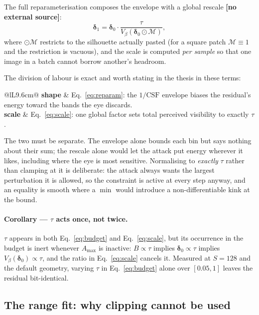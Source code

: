 \documentclass[11pt,a4paper]{article}
\newcommand{\novel}{\textbf{[no external source]}}
\begin{document}
The full reparameterisation composes the envelope with a global rescale
\novel{}:
\begin{equation}
  \boldsymbol{\delta}_1 = \boldsymbol{\delta}_0\cdot
     \frac{\tau}{V_\beta\!\left(\boldsymbol{\delta}_0\odot\mathcal{M}\right)} ,
  \label{eq:scale}
\end{equation}
where $\odot\mathcal{M}$ restricts to the silhouette actually pasted (for a
square patch $\mathcal{M}\equiv1$ and the restriction is vacuous), and the
scale is computed \emph{per sample} so that one image in a batch cannot
borrow another's headroom.

The division of labour is exact and worth stating in the thesis in these
terms:
\begin{center}
\begin{tabular}{@{}lL{9.6cm}@{}}
\toprule
\textbf{shape} & Eq.~\eqref{eq:reparam}: the $1/\mathrm{CSF}$ envelope biases
the residual's energy toward the bands the eye discards. \\
\textbf{scale} & Eq.~\eqref{eq:scale}: one global factor sets total perceived
visibility to exactly $\tau$. \\
\bottomrule
\end{tabular}
\end{center}
The two must be separate. The envelope alone bounds each bin but says
nothing about their sum; the rescale alone would let the attack put energy
wherever it likes, including where the eye is most sensitive. Normalising to
\emph{exactly} $\tau$ rather than clamping at it is deliberate: the attack
always wants the largest perturbation it is allowed, so the constraint is
active at every step anyway, and an equality is smooth where a $\min$ would
introduce a non-differentiable kink at the bound.

\paragraph{Corollary --- $\tau$ acts once, not twice.}
$\tau$ appears in both Eq.~\eqref{eq:budget} and Eq.~\eqref{eq:scale}, but
its occurrence in the budget is inert whenever $A_{\max}$ is inactive:
$B\propto\tau$ implies $\boldsymbol{\delta}_0\propto\tau$ implies
$V_\beta(\boldsymbol{\delta}_0)\propto\tau$, and the ratio in
Eq.~\eqref{eq:scale} cancels it. Measured at $S=128$ and the default
geometry, varying $\tau$ in Eq.~\eqref{eq:budget} alone over $[0.05,1]$
leaves the residual bit-identical.

\subsection{The range fit: why clipping cannot be used}
\label{sec:fitrange}
\end{document}
